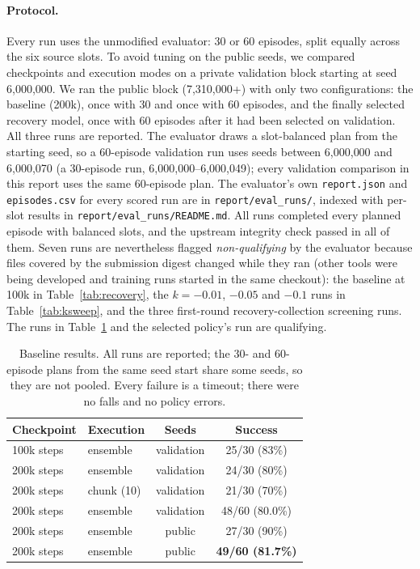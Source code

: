 \documentclass[11pt,a4paper]{article}
\begin{document}
\paragraph{Protocol.}\label{sec:protocol} Every run uses the unmodified evaluator: 30 or 60 episodes,
split equally across the six source slots. To avoid tuning on the public seeds, we compared
checkpoints and execution modes on a private validation block starting at
seed 6{,}000{,}000. We ran the public block (7{,}310{,}000+) with only two configurations:
the baseline (200k), once with 30 and once with 60 episodes, and the
finally selected recovery model, once with 60 episodes after it had
been selected on validation. All three runs are reported. The evaluator draws a slot-balanced
plan from the starting seed, so a 60-episode validation run uses seeds
between 6{,}000{,}000 and 6{,}000{,}070 (a 30-episode run, 6{,}000{,}000--6{,}000{,}049);
every validation comparison in this report uses the same 60-episode plan.
The evaluator's own \texttt{report.json} and \texttt{episodes.csv} for every
scored run are in \texttt{report/eval\_runs/}, indexed with per-slot results
in \texttt{report/eval\_runs/README.md}. All runs completed every planned
episode with balanced slots, and the upstream integrity check passed in
all of them. Seven runs are nevertheless flagged \emph{non-qualifying} by the
evaluator because files covered by the submission digest changed while they
ran (other tools were being developed and training runs started in the same
checkout): the baseline at 100k in Table~\ref{tab:recovery}, the
$k=-0.01$, $-0.05$ and $-0.1$ runs in Table~\ref{tab:ksweep}, and the
three first-round recovery-collection screening runs. The runs in
Table~\ref{tab:results} and the selected policy's run are qualifying.

\begin{table}[h]
\centering
\begin{tabular}{llcc}
\toprule
Checkpoint & Execution & Seeds & Success \\
\midrule
100k steps & ensemble & validation & 25/30 (83\%) \\
200k steps & ensemble & validation & 24/30 (80\%) \\
200k steps & chunk (10) & validation & 21/30 (70\%) \\
200k steps & ensemble & validation & 48/60 (80.0\%) \\
\midrule
200k steps & ensemble & public & 27/30 (90\%) \\
200k steps & ensemble & public & \textbf{49/60 (81.7\%)} \\
\bottomrule
\end{tabular}
\caption{Baseline results. All runs are reported; the 30- and 60-episode
plans from the same seed start share some seeds, so they are not pooled.
Every failure is a timeout; there were no falls and no policy errors.}
\label{tab:results}
\end{table}
\end{document}
